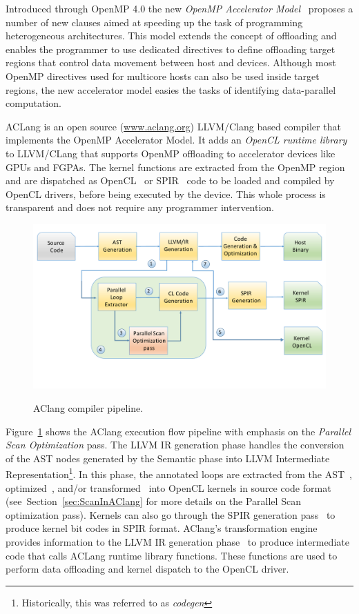 \documentclass[Ingles]{ic-tese-v1}
\newcommand{\rsec}[1]{Section~\ref{sec:#1}}
\newcommand{\rfig}[1]{Figure~\ref{fig:#1}}
\newcommand{\tit}[1]{{\textit{#1}}}
\begin{document}
Introduced  through   OpenMP  4.0  the  new   \tit{OpenMP  Accelerator
	Model}~\cite{Liao2013}  proposes a  number of  new clauses  aimed at
speeding up the task  of programming heterogeneous architectures. This
model extends the concept of  offloading and enables the programmer to
use  dedicated directives  to  define offloading  target regions  that
control data movement between host  and devices.  Although most OpenMP
directives used  for multicore  hosts can also  be used  inside target
regions, the  new accelerator  model easies  the tasks  of identifying
data-parallel computation.

ACLang is an  open  source (\url{www.aclang.org})  LLVM/Clang
based compiler that implements the  OpenMP Accelerator Model.  It adds
an {\em  OpenCL runtime  library} to  LLVM/CLang that  supports OpenMP
offloading to  accelerator devices  like GPUs  and FGPAs.   The kernel
functions are extracted  from the OpenMP region and  are dispatched as
OpenCL~\cite{opencl}  or  SPIR~\cite{spir}  code   to  be  loaded  and
compiled by OpenCL  drivers, before being executed by  the device. This
whole  process is  transparent  and does  not  require any  programmer
intervention.

\begin{figure}[t]
	\caption{AClang compiler pipeline.}
	\centering
	\includegraphics[scale=0.40]{images/aclang_scan.pdf}
	\label{fig:aclang}
\end{figure}


\rfig{aclang} shows  the AClang execution flow  pipeline with
emphasis on the \textit{Parallel Scan Optimization} pass.  The
LLVM IR generation phase handles the conversion of the AST
nodes  generated   by  the  Semantic  phase   into  LLVM  Intermediate
Representation\footnote{Historically,   this  was   referred  to   as
	\textit{codegen}}.  In this phase, the annotated loops are extracted
from     the      AST~,     optimized~,     and/or
transformed~  into  OpenCL  kernels in  source  code  format~
(see~\rsec{ScanInAClang}   for  more   details   on  the   Parallel Scan
optimization pass).   Kernels can also go  through the SPIR
generation pass~ to produce kernel bit codes in SPIR format.
AClang's  transformation engine~  provides information
to  the LLVM  IR generation  phase~ to  produce intermediate
code  that  calls  ACLang   runtime  library  functions.   These
functions are used  to perform data offloading and  kernel dispatch to
the  OpenCL  driver.
\end{document}
